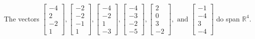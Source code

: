 \begin{exercise}
\begin{exerciseStatement}
  \end{exerciseStatement}
  \begin{exerciseAnswer}
   The vectors \(\left[\begin{array}{r}
-4 \\
2 \\
-2 \\
1
\end{array}\right] , \left[\begin{array}{r}
-2 \\
-2 \\
-1 \\
1
\end{array}\right] , \left[\begin{array}{r}
-4 \\
-2 \\
1 \\
-3
\end{array}\right] , \left[\begin{array}{r}
-4 \\
-3 \\
-2 \\
-5
\end{array}\right] , \left[\begin{array}{r}
2 \\
0 \\
3 \\
-2
\end{array}\right] , \text{ and } \left[\begin{array}{r}
-1 \\
-4 \\
3 \\
-4
\end{array}\right]\) 
  	 do  
	span \(\mathbb{R}^4\).
  


  \end{exerciseAnswer}
\end{exercise}